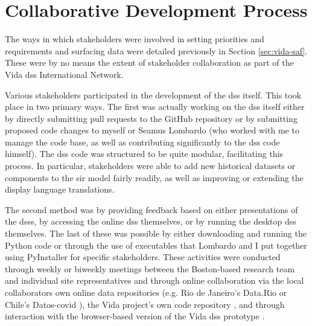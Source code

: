 \section{Collaborative Development Process} \label{sec:vida-collab}

The ways in which stakeholders were involved in setting priorities and requirements and surfacing data were detailed previously in Section \ref{sec:vida-saf}. These were by no means the extent of stakeholder collaboration as part of the Vida \ac{dss} International Network.

Various stakeholders participated in the development of the \ac{dss} itself. This took place in two primary ways. The first was actually working on the \ac{dss} itself either by directly submitting pull requests to the GitHub repository or by submitting proposed code changes to myself or Seamus Lombardo (who worked with me to manage the code base, as well as contributing significantly to the \ac{dss} code himself). The \ac{dss} code was structured to be quite modular, facilitating this process. In particular, stakeholders were able to add new historical datasets or components to the \ac{sir} model fairly readily, as well as improving or extending the display language translations. 

The second method was by providing feedback based on either presentations of the \acp{dss}, by accessing the online \ac{dss} themselves, or by running the desktop \ac{dss} themselves. The last of these was possible by either downloading and running the Python code or through the use of executables that Lombardo and I put together using PyInstaller for specific stakeholders. These activities were conducted through weekly or biweekly meetings between the Boston-based research team and individual site representatives and through online collaboration via the local collaborators own online data repositories (e.g. Rio de Janeiro's Data.Rio \cite{institutopereirapassosDataRio2017} or Chile's Datos-\ac{covid} \cite{ministeriodecienciatecnologiaconocimientoeinnovacionDatosCOVID192021}), the Vida project's own code repository \cite{reidMITVidaRepository2021}, and through interaction with the browser-based version of the Vida \ac{dss} prototype \cite{bluerasterMITVidaSupportBoston2021}.

